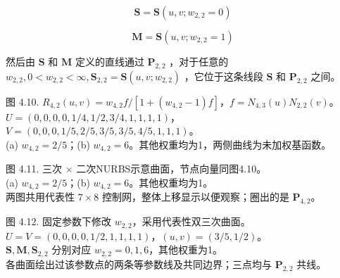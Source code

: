 \documentclass[../main.tex]{subfiles}
\begin{document}
\[
\mathbf{S} = \mathbf{S}\left( {u,v;{w}_{2,2} = 0}\right)
\]

\[
\mathbf{M} = \mathbf{S}\left( {u,v;{w}_{2,2} = 1}\right)  \tag{4.14}
\]

然后由 \(\mathbf{S}\) 和 \(\mathbf{M}\) 定义的直线通过 \({\mathbf{P}}_{2,2}\) ，对于任意的 \({w}_{2,2},0 < {w}_{2,2} < \infty ,{\mathbf{S}}_{2,2} = \mathbf{S}\left( {u,v;{w}_{2,2}}\right)\) ，它位于这条线段 \(\mathbf{S}\) 和 \({\mathbf{P}}_{2,2}\) 之间。





\begin{center}
\begin{minipage}{18cm}
\vspace*{.6\baselineskip}
\centering
{}
\par\medskip
{}
\par\smallskip
图 4.10. \(R_{4,2}(u,v)=w_{4,2}f/[1+(w_{4,2}-1)f]\)，\(f=N_{4,3}(u)N_{2,2}(v)\)。\\ \(U=(0,0,0,0,1/4,1/2,3/4,1,1,1,1)\)，\\ \(V=(0,0,0,1/5,2/5,3/5,3/5,4/5,1,1,1)\)。\\ (a) \(w_{4,2}=2/5\)；(b) \(w_{4,2}=6\)。其他权重均为1，两侧曲线为未加权基函数。
\end{minipage}
\end{center}

\begin{center}
\begin{minipage}{18cm}
\vspace*{.6\baselineskip}
\centering
{}
\par\medskip
{}
\par\smallskip
图 4.11. 三次 \(\times\) 二次NURBS示意曲面，节点向量同图4.10。\\ (a) \(w_{4,2}=2/5\)；(b) \(w_{4,2}=6\)。其他权重均为1。\\ 两图共用代表性 \(7\times8\) 控制网，整体上移显示以便观察；圈出的是 \(\mathbf P_{4,2}\)。
\end{minipage}
\end{center}

\begin{center}
\begin{minipage}{18cm}
\vspace*{.6\baselineskip}
\centering
{}
\par\smallskip
图 4.12. 固定参数下修改 \(w_{2,2}\)，采用代表性双三次曲面。\\ \(U=V=(0,0,0,0,1/2,1,1,1,1)\)，\((u,v)=(3/5,1/2)\)。\\ \(\mathbf S,\mathbf M,\mathbf S_{2,2}\) 分别对应 \(w_{2,2}=0,1,6\)，其他权重为1。\\ 各曲面绘出过该参数点的两条等参数线及共同边界；三点均与 \(\mathbf P_{2,2}\) 共线。
\end{minipage}
\end{center}
\end{document}
